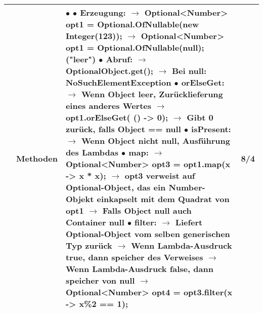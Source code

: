 \documentclass[11pt,a4paper]{article}
\begin{document}
\begin{center}
\begin{longtable}[h]{ | p{2.3cm} | p{2.3cm} | p{12.6cm} | p{1.2cm} | }
	& Methoden & \makecell[l]{$\bullet$ $\bullet$ Erzeugung: \\ 
	\hspace{0.4cm} $\rightarrow$ Optional<Number> opt1 = Optional.OfNullable(new Integer(123)); \\
	\hspace{0.4cm} $\rightarrow$ Optional<Number> opt1 = Optional.OfNullable(null); ("leer") \\
	$\bullet$ Abruf: \\ \hspace{0.4cm} $\rightarrow$ OptionalObject.get(); \\
	\hspace{0.4cm} $\rightarrow$ Bei null: NoSuchElementException \\
	$\bullet$ orElseGet: \\ \hspace{0.4cm} $\rightarrow$ Wenn Object leer, Zurücklieferung eines anderes Wertes \\
	\hspace{0.4cm} $\rightarrow$ opt1.orElseGet( () -> 0); $\rightarrow$ Gibt 0 zurück, falls Object == null \\
	$\bullet$ isPresent: \\ \hspace{0.4cm} $\rightarrow$ Wenn Object nicht null, Ausführung des Lambdas \\
	$\bullet$ map: \\ \hspace{0.4cm} $\rightarrow$ Optional<Number> opt3 = opt1.map(x -> x * x); \\
	\hspace{0.4cm} $\rightarrow$ opt3 verweist auf Optional-Object, das ein Number-Objekt \\ 
	\hspace{1cm} einkapselt mit dem Quadrat von opt1 \\
	\hspace{0.4cm} $\rightarrow$ Falls Object null auch Container null \\
	$\bullet$ filter: \\ \hspace{0.4cm} $\rightarrow$ Liefert Optional-Object vom selben generischen Typ zurück \\
	\hspace{0.4cm} $\rightarrow$ Wenn Lambda-Ausdruck true, dann speicher des Verweises \\
	\hspace{0.4cm} $\rightarrow$ Wenn Lambda-Ausdruck false, dann speicher von null \\
	\hspace{0.4cm} $\rightarrow$ Optional<Number> opt4 = opt3.filter(x -> x\%2 == 1);  }  & 8/4 \\ \cline{2-4}
	\hline
	



\end{longtable}
\end{center}
\end{document}
